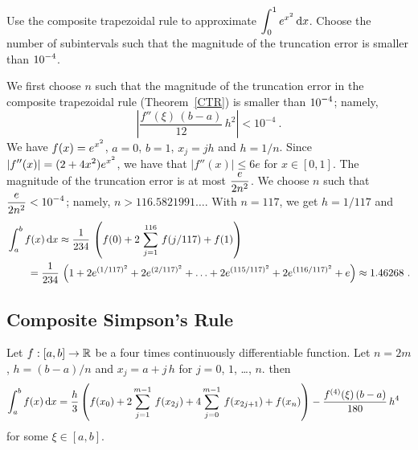 \begin{egg}
Use the composite trapezoidal rule to approximate
$\displaystyle \int_0^1 e^{x^2}\,\mathrm{d}x$.
Choose the number of subintervals such that the magnitude of the
truncation error is smaller than $\displaystyle 10^{-4}$.

We first choose $n$ such that the magnitude of the truncation error in
the composite trapezoidal rule (Theorem~\ref{CTR}) is smaller than
$\displaystyle 10^{-4}$; namely,
\[
\left| \frac{f''(\xi)\,(b-a)}{12}\,h^2 \right| < 10^{-4} \ .
\]
We have $\displaystyle f(x)=e^{x^2}$, $a=0$, $b=1$, $x_j = jh$ and
$h = 1/n$.  Since $\displaystyle |f''(x)|=(2+4x^2)e^{x^2}$,
we have that $|f''(x)|\leq 6e$ for $x \in [0,1]$.  The magnitude of
the truncation error is at most $\displaystyle \frac{e}{2n^2}$.  We
choose $n$ such that $\displaystyle \frac{e}{2n^2} <10^{-4}$; namely, 
$n> 116.5821991\ldots$.  With $n=117$, we get $h=1/117$ and
\begin{align*}
&\int_{a}^{b}f(x)\,\mathrm{d}x \approx
\frac{1}{234}\, \left(f(0)+2\,\sum_{j=1}^{116}\,f(j/117)+f(1)\right) \\
&\qquad = \frac{1}{234}\, \left( 1 + 2e^{(1/117)^2}
+2e^{(2/117)^2}+ \ldots + 2e^{(115/117)^2}+2e^{(116/117)^2}
+ e \right) \approx 1.46268 \ .
\end{align*}
\label{T1}
\end{egg}

\subsection{Composite Simpson's Rule}

\begin{theorem}
Let $f:[a,b]\rightarrow \mathbb{R}$ be a four times continuously
differentiable function.  Let $n=2m$, $h=(b-a)/n$ and
$x_j = a+j\,h$ for $j=0$, $1$, \ldots, $n$.  then
\begin{align*}
\int_{a}^{b}f(x)\,\mathrm{d}x &=
\frac{h}{3} \left(f(x_0) + 2\sum_{j=1}^{m-1}\,f(x_{2j}) + 4
\sum_{j=0}^{m-1}\,f(x_{2j+1}) + f(x_n) \right) -
\frac{f^{(4)}(\xi)\,(b-a)}{180}\, h^4
\end{align*}
for some $\xi \in [a,b]$.
\label{CSR}
\end{theorem}

